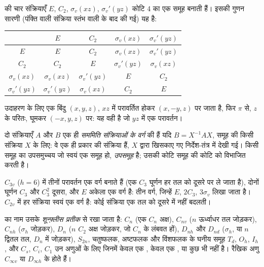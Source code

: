 \begin{example}[जल का समूह]\label{ex:b3:point-groups:c2v}
 की चार संक्रियाएँ $E$, $C_2$, $\sigma_v(xz)$, $\sigma_v'(yz)$ कोटि 4 का
एक समूह बनाती हैं। इसकी गुणन सारणी (पंक्ति वाली संक्रिया स्तंभ वाली के
बाद की गई) यह है:
\begin{center}\small
\begin{tabular}{c|cccc}
\hline
 & $E$ & $C_2$ & $\sigma_v(xz)$ & $\sigma_v'(yz)$\\ \hline
$E$ & $E$ & $C_2$ & $\sigma_v(xz)$ & $\sigma_v'(yz)$\\
$C_2$ & $C_2$ & $E$ & $\sigma_v'(yz)$ & $\sigma_v(xz)$\\
$\sigma_v(xz)$ & $\sigma_v(xz)$ & $\sigma_v'(yz)$ & $E$ & $C_2$\\
$\sigma_v'(yz)$ & $\sigma_v'(yz)$ & $\sigma_v(xz)$ & $C_2$ & $E$\\ \hline
\end{tabular}
\end{center}
उदाहरण के लिए एक बिंदु $(x, y, z)$, $xz$ में परावर्तित होकर $(x, -y, z)$ पर जाता है, फिर
$\pi$ से, $z$ के परितः, घूमकर $(-x, y, z)$ पर: यह वही है जो
$yz$ में एक परावर्तन।
\end{example}

\begin{definition}\label{def:b3:point-groups:class}
दो संक्रियाएँ $A$ और $B$ एक ही \emph{सममिति संक्रियाओं के
वर्ग} की हैं यदि $B = X^{-1}AX$, समूह की किसी
संक्रिया $X$ के लिए: वे एक ही प्रकार की संक्रिया हैं, $X$ द्वारा खिसकाए गए
निर्देश-तंत्र में देखी गई। किसी समूह का उपसमुच्चय जो स्वयं एक समूह हो,
\emph{उपसमूह} है; उसकी कोटि समूह की कोटि को विभाजित करती है।
\end{definition}

\begin{example}[\ce{NH3} के वर्ग]\label{ex:b3:point-groups:classes}
$C_{3v}$ ($h = 6$) में तीनों परावर्तन एक वर्ग बनाते हैं (एक $C_3$ घूर्णन
हर तल को दूसरे पर ले जाता है), दोनों घूर्णन $C_3$ और $C_3^2$ दूसरा,
और $E$ अकेला एक वर्ग है: तीन वर्ग, जिन्हें $E$, $2C_3$, $3\sigma_v$ लिखा जाता है।
$C_{2v}$ में हर संक्रिया स्वयं एक वर्ग है: कोई संक्रिया एक तल को
दूसरे में नहीं बदलती।
\end{example}

\begin{definition}[शून्फ़्लीस प्रतीक]\label{def:b3:point-groups:schoenflies}
 का नाम उसके \emph{शून्फ़्लीस प्रतीक} से रखा जाता है:
$C_n$ (एक $C_n$ अक्ष), $C_{nv}$ ($n$ ऊर्ध्वाधर तल जोड़कर), $C_{nh}$
($\sigma_h$ जोड़कर), $D_n$ ($n$ $C_2$ अक्ष जोड़कर, जो $C_n$ के लंबवत हों), $D_{nh}$
और $D_{nd}$ ($\sigma_h$, या $n$ द्वितल तल, $D_n$ में जोड़कर), $S_{2n}$,
चतुष्फलक, अष्टफलक और विंशफलक के घनीय समूह $T_d$, $O_h$, $I_h$,
और $C_s$, $C_i$, $C_1$ उन अणुओं के लिए जिनमें केवल एक ,
केवल एक , या कुछ भी नहीं है। रैखिक अणु
$C_{\infty v}$ या $D_{\infty h}$ के होते हैं।
\end{definition}

